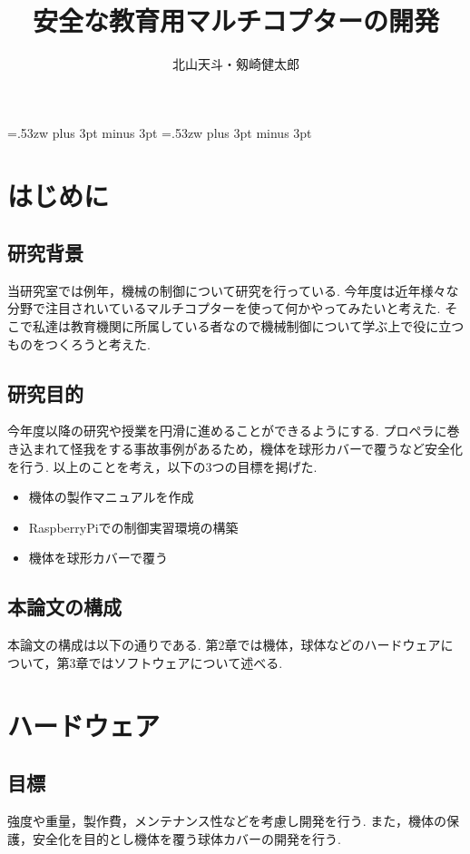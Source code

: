 \documentclass[12pt,oneside]{sotsuken_paper}
\title{安全な教育用マルチコプターの開発}
\author{北山天斗・剱崎健太郎}
\begin{document}
\setlength{\baselineskip}{9truemm}

\kanjiskip=.53zw plus 3pt minus 3pt
\xkanjiskip=.53zw plus 3pt minus 3pt

\tableofcontents


\chapter{はじめに}

\section{研究背景}
当研究室では例年，機械の制御について研究を行っている.
今年度は近年様々な分野で注目されいているマルチコプターを使って何かやってみたいと考えた.
そこで私達は教育機関に所属している者なので機械制御について学ぶ上で役に立つものをつくろうと考えた.

\section{研究目的}
今年度以降の研究や授業を円滑に進めることができるようにする.
プロペラに巻き込まれて怪我をする事故事例があるため，機体を球形カバーで覆うなど安全化を行う.
以上のことを考え，以下の3つの目標を掲げた.

\begin{itemize}
	\item 機体の製作マニュアルを作成
	\item RaspberryPiでの制御実習環境の構築
	\item 機体を球形カバーで覆う
\end{itemize}

\section{本論文の構成}
本論文の構成は以下の通りである.
第2章では機体，球体などのハードウェアについて，第3章ではソフトウェアについて述べる.


\chapter{ハードウェア}

\section{目標}
強度や重量，製作費，メンテナンス性などを考慮し開発を行う.
また，機体の保護，安全化を目的とし機体を覆う球体カバーの開発を行う.
\end{document}

